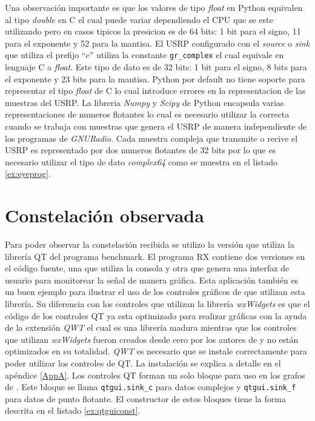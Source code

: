 Una observaci\'on importante es que los valores de tipo \emph{float} en Python equivalen al tipo
\emph{double} en C el cual puede variar dependiendo el CPU que se este utilizando pero en casos
tipicos la presicion es de 64 bits: 1 bit para el signo, 11 para el exponente y 52 para la mantisa.
\cite{python} El USRP configurado con el \emph{source} o \emph{sink} que utiliza el prefijo ``c''
utiliza la constante \verb|gr_complex| el cual equivale en lenguaje C a \emph{float}. Este tipo de
dato es de 32 bits: 1 bit para el signo, 8 bits para el exponente y 23 bits para la mantisa. Python
por default no tiene soporte para representar el tipo \emph{float} de C lo cual introduce errores en la
representacion de las muestras del USRP. La libreria \emph{Numpy} y \emph{Scipy} de Python encapsula
varias representaciones de numeros flotantes \cite{scipy} lo cual es necesario utilizar la correcta
cuando se trabaja con muestras que genera el USRP de manera independiente de los programas de
\emph{GNURadio}. Cada muestra compleja que transmite o recive el USRP es representado por dos
numeros flotantes de 32 bits por lo que es necesario utilizar el tipo de dato \emph{complex64} como
se muestra en el listado \ref{ex:eyeprog}.
\section{Constelaci\'on observada}

Para poder observar la constelaci\'on recibida se utilizo la versi\'on que utiliza la librer\'ia QT
del programa benchmark. El programa RX contiene dos versiones en el c\'odigo fuente, una que utiliza
la consola y otra que genera una interfaz de usuario para monitorear la se\~nal de manera gr\'afica.
Esta aplicaci\'on tambi\'en es un buen ejemplo para ilustrar el uso de los controles gr\'aficos de
\gnuradio que utilizan esta librer\'ia. Su diferencia con los controles que utilizan la librer\'ia
\emph{wxWidgets} es que el c\'odigo de los controles QT ya esta optimizado para realizar gr\'aficas
con la ayuda de la extensi\'on \emph{QWT} el cual es una librer\'ia madura mientras que los
controles que utilizan \emph{wxWidgets} fueron creados desde cero por los autores de \gnuradio y no
est\'an optimizados en su totalidad. \emph{QWT} es necesario que se instale correctamente para poder
utilizar los controles de QT. La instalaci\'on se explica a detalle en el ap\'endice \ref{AppA}. Los
controles QT forman un solo bloque para uso en los grafos de \gnuradio. Este bloque se llama
\verb|qtgui.sink_c| para datos complejos y \verb|qtgui.sink_f| para datos de punto flotante. El
constructor de estos bloques tiene la forma descrita en el listado \ref{ex:qtguiconst}.

